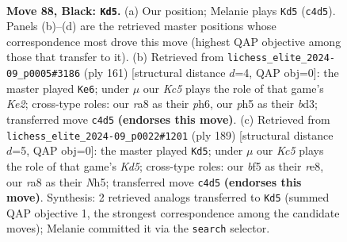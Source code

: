 \documentclass[11pt]{article}
\begin{document}
\clearpage

\begin{figure}[p]\centering
\begin{subfigure}{0.46\textwidth}\centering
\resizebox{\linewidth}{!}{%
\newchessgame
\chessboard[
  setfen={R7/5P2/8/5B1P/2k5/8/8/7K b - - 8 88},
  showmover=false,
  pgfstyle=straightmove, color=movearrow, markmove={c4-d5}
]}
\caption{}
\end{subfigure}\hfill
\begin{subfigure}{0.46\textwidth}\centering
\resizebox{\linewidth}{!}{%
\newchessgame
\chessboard[
  setfen={8/4k3/2K4P/8/6p1/3B2B1/8/8 b - - 0 81},
  showmover=false,
  pgfstyle=straightmove, color=movearrow, markmove={e7-e6}
]}
\caption{}
\end{subfigure}
\\[4pt]
\begin{subfigure}{0.46\textwidth}\centering
\resizebox{\linewidth}{!}{%
\newchessgame
\chessboard[
  setfen={4R3/8/8/K4P1n/3k4/8/8/8 b - - 0 95},
  showmover=false,
  pgfstyle=straightmove, color=movearrow, markmove={d4-d5}
]}
\caption{}
\end{subfigure}\hfill

\caption{\textbf{Move 88, Black: \texttt{Kd5}.} (a) Our position; Melanie plays \texttt{Kd5} (\texttt{c4d5}). Panels (b)--(d) are the retrieved master positions whose correspondence most drove this move (highest QAP objective among those that transfer to it). (b) Retrieved from \texttt{lichess\_elite\_2024-09\_p0005\#3186} (ply 161) [structural distance $d$=4, QAP obj=0]: the master played \texttt{Ke6}; under $\mu$ our \emph{Kc5} plays the role of that game's \emph{Ke2}; cross-type roles: our \emph{r}a8 as their \emph{p}h6, our \emph{p}h5 as their \emph{b}d3; transferred move \texttt{c4d5} \textbf{(endorses this move)}. (c) Retrieved from \texttt{lichess\_elite\_2024-09\_p0022\#1201} (ply 189) [structural distance $d$=5, QAP obj=0]: the master played \texttt{Kd5}; under $\mu$ our \emph{Kc5} plays the role of that game's \emph{Kd5}; cross-type roles: our \emph{b}f5 as their \emph{r}e8, our \emph{r}a8 as their \emph{N}h5; transferred move \texttt{c4d5} \textbf{(endorses this move)}. Synthesis: 2 retrieved analogs transferred to \texttt{Kd5} (summed QAP objective 1, the strongest correspondence among the candidate moves); Melanie committed it via the \texttt{search} selector.}
\label{fig:thought-m175}
\end{figure}

\clearpage
\end{document}
